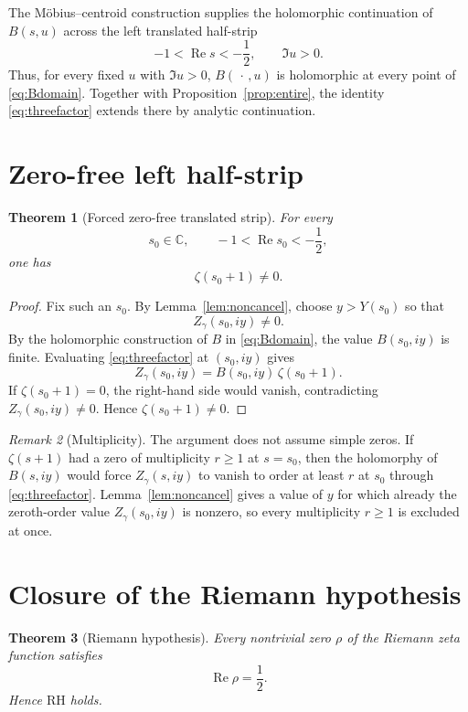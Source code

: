 \documentclass[11pt]{amsart}
\newtheorem{theorem}{Theorem}
\theoremstyle{remark}
\newtheorem{remark}[theorem]{Remark}
\newcommand{\RH}{\mathrm{RH}}
\newcommand{\Ree}{\operatorname{Re}}
\begin{document}
The M\"obius--centroid construction supplies the holomorphic continuation of $B(s,u)$ across the left translated half-strip
\begin{equation}\label{eq:Bdomain}
\boxed{
-1<\Ree s< -\frac12,
\qquad \Im u>0.
}
\end{equation}
Thus, for every fixed $u$ with $\Im u>0$, $B(\,\cdot\,,u)$ is holomorphic at every point of \eqref{eq:Bdomain}.  Together with Proposition~\ref{prop:entire}, the identity \eqref{eq:threefactor} extends there by analytic continuation.

\section{Zero-free left half-strip}

\begin{theorem}[Forced zero-free translated strip]\label{thm:zerofree}
For every
\[
s_0\in\mathbb C,
\qquad
-1<\Ree s_0< -\frac12,
\]
one has
\[
\boxed{\zeta(s_0+1)\neq0.}
\]
\end{theorem}

\begin{proof}
Fix such an $s_0$.  By Lemma~\ref{lem:noncancel}, choose $y>Y(s_0)$ so that
\[
Z_\gamma(s_0,iy)\neq0.
\]
By the holomorphic construction of $B$ in \eqref{eq:Bdomain}, the value $B(s_0,iy)$ is finite.  Evaluating \eqref{eq:threefactor} at $(s_0,iy)$ gives
\[
Z_\gamma(s_0,iy)
=
B(s_0,iy)\,\zeta(s_0+1).
\]
If $\zeta(s_0+1)=0$, the right-hand side would vanish, contradicting
$Z_\gamma(s_0,iy)\neq0$.  Hence $\zeta(s_0+1)\neq0$.
\end{proof}

\begin{remark}[Multiplicity]
The argument does not assume simple zeros.  If $\zeta(s+1)$ had a zero of multiplicity $r\ge1$ at $s=s_0$, then the holomorphy of $B(s,iy)$ would force $Z_\gamma(s,iy)$ to vanish to order at least $r$ at $s_0$ through \eqref{eq:threefactor}.  Lemma~\ref{lem:noncancel} gives a value of $y$ for which already the zeroth-order value $Z_\gamma(s_0,iy)$ is nonzero, so every multiplicity $r\ge1$ is excluded at once.
\end{remark}

\section{Closure of the Riemann hypothesis}

\begin{theorem}[Riemann hypothesis]\label{thm:RH}
Every nontrivial zero $\rho$ of the Riemann zeta function satisfies
\[
\Ree\rho=\frac12.
\]
Hence $\RH$ holds.
\end{theorem}
\end{document}
